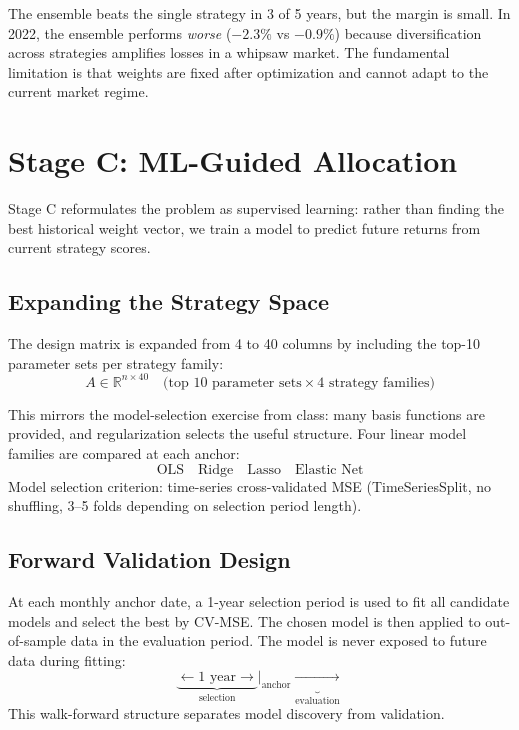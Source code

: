 \documentclass[11pt, letterpaper]{article}
\begin{document}
The ensemble beats the single strategy in 3 of 5 years, but the margin is small.
In 2022, the ensemble performs \textit{worse} ($-2.3\%$ vs $-0.9\%$) because
diversification across strategies amplifies losses in a whipsaw market. The
fundamental limitation is that weights are fixed after optimization and cannot
adapt to the current market regime.

\section{Stage C: ML-Guided Allocation}

Stage C reformulates the problem as supervised learning: rather than finding the
best historical weight vector, we train a model to predict future returns from
current strategy scores.

\subsection{Expanding the Strategy Space}

The design matrix is expanded from 4 to 40 columns by including the top-10
parameter sets per strategy family:
\[
  A \in \mathbb{R}^{n \times 40}
  \quad \text{(top 10 parameter sets} \times \text{4 strategy families)}
\]

This mirrors the model-selection exercise from class: many basis functions are
provided, and regularization selects the useful structure. Four linear model
families are compared at each anchor:
\[
  \text{OLS} \quad \text{Ridge} \quad \text{Lasso} \quad \text{Elastic Net}
\]
Model selection criterion: time-series cross-validated MSE (TimeSeriesSplit, no
shuffling, 3--5 folds depending on selection period length).

\subsection{Forward Validation Design}

At each monthly anchor date, a 1-year selection period is used to fit all candidate
models and select the best by CV-MSE. The chosen model is then applied to
out-of-sample data in the evaluation period. The model is never exposed to future
data during fitting:
\[
  \underbrace{\longleftarrow \text{1 year} \longrightarrow}_{\text{selection}}
  \Big|_{\text{anchor}}
  \underbrace{\longrightarrow}_{\text{evaluation}}
\]
This walk-forward structure separates model discovery from validation.
\end{document}

